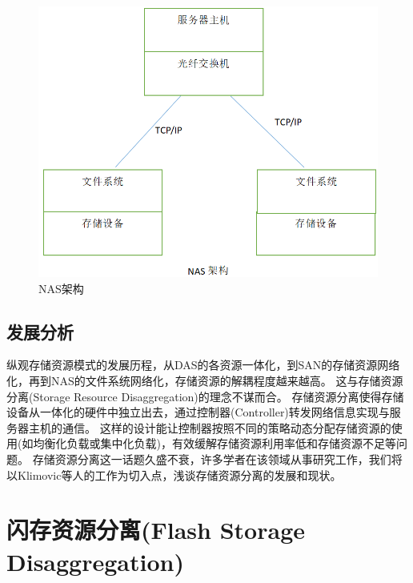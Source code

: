 \begin{figure}
\centering
\includegraphics[scale=0.45]{Figures/storage/nas_architecture.jpg}
\decoRule
\caption{NAS架构}
\label{fig:nas_architecture}
\end{figure}

\subsection{发展分析}
纵观存储资源模式的发展历程，从DAS的各资源一体化，到SAN的存储资源网络化，再到NAS的文件系统网络化，存储资源的解耦程度越来越高。
这与存储资源分离(Storage Resource Disaggregation)的理念不谋而合。
存储资源分离使得存储设备从一体化的硬件中独立出去，通过控制器(Controller)转发网络信息实现与服务器主机的通信。
这样的设计能让控制器按照不同的策略动态分配存储资源的使用(如均衡化负载或集中化负载)，有效缓解存储资源利用率低和存储资源不足等问题。
存储资源分离这一话题久盛不衰，许多学者在该领域从事研究工作，我们将以Klimovic等人\cite{klimovic2016flash}的工作为切入点，浅谈存储资源分离的发展和现状。


\section{闪存资源分离(Flash Storage Disaggregation)}

